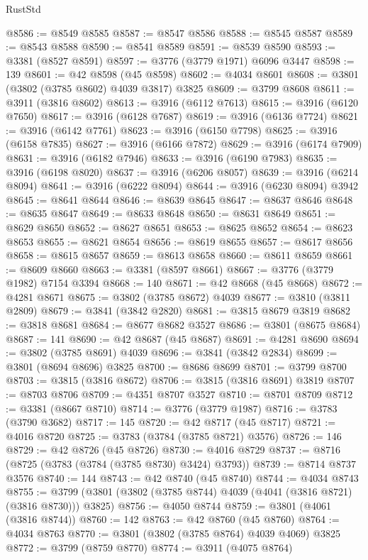 \begin{lexlean}{RustStd}
\begin{coremodule}
@8586 := @8549 @8585
@8587 := @8547 @8586
@8588 := @8545 @8587
@8589 := @8543 @8588
@8590 := @8541 @8589
@8591 := @8539 @8590
@8593 := @3381 (@8527 @8591)
@8597 := @3776 (@3779 @1971) @6096 @3447
@8598 := 139
@8601 := @42 @8598 (@45 @8598)
@8602 := @4034 @8601
@8608 := @3801 (@3802 (@3785 @8602) @4039 @3817) @3825
@8609 := @3799 @8608
@8611 := @3911 (@3816 @8602)
@8613 := @3916 (@6112 @7613)
@8615 := @3916 (@6120 @7650)
@8617 := @3916 (@6128 @7687)
@8619 := @3916 (@6136 @7724)
@8621 := @3916 (@6142 @7761)
@8623 := @3916 (@6150 @7798)
@8625 := @3916 (@6158 @7835)
@8627 := @3916 (@6166 @7872)
@8629 := @3916 (@6174 @7909)
@8631 := @3916 (@6182 @7946)
@8633 := @3916 (@6190 @7983)
@8635 := @3916 (@6198 @8020)
@8637 := @3916 (@6206 @8057)
@8639 := @3916 (@6214 @8094)
@8641 := @3916 (@6222 @8094)
@8644 := @3916 (@6230 @8094) @3942
@8645 := @8641 @8644
@8646 := @8639 @8645
@8647 := @8637 @8646
@8648 := @8635 @8647
@8649 := @8633 @8648
@8650 := @8631 @8649
@8651 := @8629 @8650
@8652 := @8627 @8651
@8653 := @8625 @8652
@8654 := @8623 @8653
@8655 := @8621 @8654
@8656 := @8619 @8655
@8657 := @8617 @8656
@8658 := @8615 @8657
@8659 := @8613 @8658
@8660 := @8611 @8659
@8661 := @8609 @8660
@8663 := @3381 (@8597 @8661)
@8667 := @3776 (@3779 @1982) @7154 @3394
@8668 := 140
@8671 := @42 @8668 (@45 @8668)
@8672 := @4281 @8671
@8675 := @3802 (@3785 @8672) @4039
@8677 := @3810 (@3811 @2809)
@8679 := @3841 (@3842 @2820)
@8681 := @3815 @8679 @3819
@8682 := @3818 @8681
@8684 := @8677 @8682 @3527
@8686 := @3801 (@8675 @8684)
@8687 := 141
@8690 := @42 @8687 (@45 @8687)
@8691 := @4281 @8690
@8694 := @3802 (@3785 @8691) @4039
@8696 := @3841 (@3842 @2834)
@8699 := @3801 (@8694 @8696) @3825
@8700 := @8686 @8699
@8701 := @3799 @8700
@8703 := @3815 (@3816 @8672)
@8706 := @3815 (@3816 @8691) @3819
@8707 := @8703 @8706
@8709 := @4351 @8707 @3527
@8710 := @8701 @8709
@8712 := @3381 (@8667 @8710)
@8714 := @3776 (@3779 @1987)
@8716 := @3783 (@3790 @3682)
@8717 := 145
@8720 := @42 @8717 (@45 @8717)
@8721 := @4016 @8720
@8725 := @3783 (@3784 (@3785 @8721) @3576)
@8726 := 146
@8729 := @42 @8726 (@45 @8726)
@8730 := @4016 @8729
@8737 := @8716 (@8725 (@3783 (@3784 (@3785 @8730) @3424) @3793))
@8739 := @8714 @8737 @3576
@8740 := 144
@8743 := @42 @8740 (@45 @8740)
@8744 := @4034 @8743
@8755 := @3799 (@3801 (@3802 (@3785 @8744) @4039 (@4041 (@3816 @8721) (@3816 @8730))) @3825)
@8756 := @4050 @8744
@8759 := @3801 (@4061 (@3816 @8744))
@8760 := 142
@8763 := @42 @8760 (@45 @8760)
@8764 := @4034 @8763
@8770 := @3801 (@3802 (@3785 @8764) @4039 @4069) @3825
@8772 := @3799 (@8759 @8770)
@8774 := @3911 (@4075 @8764)

\end{coremodule}
\end{lexlean}

